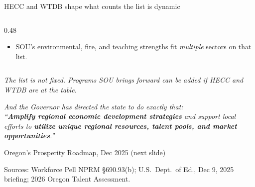 \documentclass[aspectratio=169,11pt]{beamer}
\newcommand{\monoLabel}[1]{%
  {\ttfamily\fontsize{7.5pt}{9pt}\selectfont\color{textMuted}#1}%
}
\begin{document}
\begin{frame}{HECC and WTDB shape what counts \textemdash{} the list is dynamic}
\begin{columns}[T,onlytextwidth]
\begin{column}{0.48\textwidth}
\begin{itemize}
              five criteria.
        \item SOU's environmental, fire, and teaching strengths
              fit \emph{multiple} sectors on that list.
      \end{itemize}
    \end{column}
  \end{columns}
  \vspace{4pt}
  \begin{center}
    \itshape\color{textSecondary}\fontsize{9.5pt}{12.5pt}\selectfont
    The list is not fixed. Programs SOU brings forward can be
    added \textemdash{} if HECC and WTDB are at the table.
  \end{center}
  \par\vspace{4pt}
  \begin{center}
    \itshape\color{textSecondary}\fontsize{8.6pt}{11.5pt}\selectfont
    And the Governor has directed the state to do exactly that:\\
    ``\textbf{Amplify regional economic development strategies}
    and support local efforts to \textbf{utilize unique regional
    resources, talent pools, and market opportunities}.''\par
    \vspace{2pt}
    \monoLabel{\textemdash{} Oregon's Prosperity Roadmap, Dec 2025 (next slide)}
  \end{center}
  \par\vspace{2pt}
  \monoLabel{Sources: Workforce Pell NPRM \S 690.93(b); U.S.\ Dept.\ of Ed., Dec 9, 2025 briefing; 2026 Oregon Talent Assessment.}
\end{frame}
\end{document}
